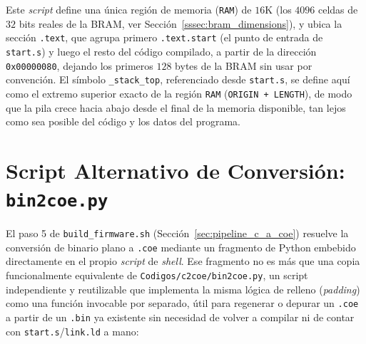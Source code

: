 Este \textit{script} define una única región de memoria (\texttt{RAM}) de
$16\text{K}$ (los $4096$ celdas de $32$ bits reales de la BRAM, ver
Sección~\ref{sssec:bram_dimensions}), y ubica la sección \texttt{.text}, que agrupa primero \texttt{.text.start} (el punto de entrada de
\texttt{start.s}) y luego el resto del código compilado, a partir de la
dirección \texttt{0x00000080}, dejando los primeros $128$ bytes de la
BRAM sin usar por convención. El símbolo \texttt{\_stack\_top}, referenciado
desde \texttt{start.s}, se define aquí como el extremo superior exacto de
la región \texttt{RAM} (\texttt{ORIGIN + LENGTH}), de modo que la pila
crece hacia abajo desde el final de la memoria disponible, tan lejos como
sea posible del código y los datos del programa.

\section{Script Alternativo de Conversión: \texttt{bin2coe.py}}
\label{sec:bin2coe}

El paso 5 de \texttt{build\_firmware.sh} (Sección~\ref{sec:pipeline_c_a_coe})
resuelve la conversión de binario plano a \texttt{.coe} mediante un
fragmento de Python embebido directamente en el propio \textit{script} de
\textit{shell}. Ese fragmento no es más que una copia funcionalmente
equivalente de \texttt{Codigos/c2coe/bin2coe.py}, un script independiente
y reutilizable que implementa la misma lógica de relleno (\textit{padding})
como una función invocable por separado, útil para regenerar o depurar un
\texttt{.coe} a partir de un \texttt{.bin} ya existente sin necesidad de
volver a compilar ni de contar con \texttt{start.s}/\texttt{link.ld} a
mano:


